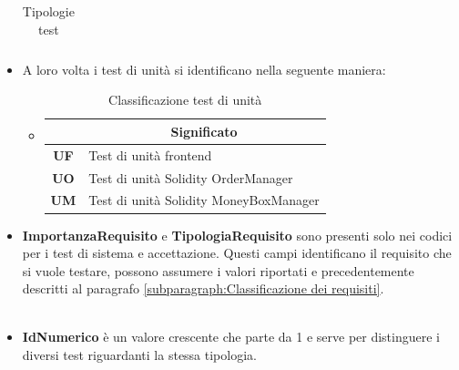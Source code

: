 \begin{itemize}[label={}]
\begin{table}[H]
\begin{tabular}{c|c|p{12cm}}
              \end{tabular}
              \caption{Tipologie test}
          \end{table}
    \vspace {1cm}      
   \item A loro volta i test di unità si identificano nella seguente maniera:
\begin{itemize}
\item    
\begin{table}[H]
    \centering
    \renewcommand{\arraystretch}{1.8}
    \begin{tabular}{c|l}
        \rowcolor[HTML]{125E28}
        \multicolumn{1}{c}{\color[HTML]{FFFFFF}\textbf{Sigla}}
        & \multicolumn{1}{c}{\color[HTML]{FFFFFF}\textbf{Significato}}\\
      \hline
        \textbf{UF}& Test di unità frontend\glo{}                                                                                                                 \\
        \textbf{UO}& Test di unità Solidity OrderManager                                                                                                           \\
        \textbf{UM}& Test di unità Solidity MoneyBoxManager                                                                                                         \\
    \end{tabular}                                               
    \caption{Classificazione test di unità}
\end{table}
\end {itemize}
    \item \textbf{ImportanzaRequisito} e \textbf{TipologiaRequisito} sono presenti solo nei codici per i test di sistema e accettazione. Questi campi identificano il requisito che si vuole testare, possono assumere i valori riportati e precedentemente descritti al paragrafo \ref{subparagraph:Classificazione dei requisiti}.\\\\
    \item \textbf{IdNumerico} è un valore crescente che parte da 1 e serve per distinguere i diversi test riguardanti la stessa tipologia.
\end{itemize}



